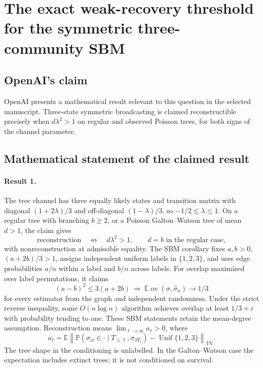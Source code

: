 \documentclass[11pt]{article}
\begin{document}
\section*{The exact weak-recovery threshold for the symmetric three-community SBM}

\subsection{OpenAI's claim}
OpenAI presents a mathematical result relevant to this question in the selected manuscript. Three-state symmetric broadcasting is claimed reconstructible precisely when $d\lambda^2>1$ on regular and observed Poisson trees, for both signs of the channel parameter.

\subsection{Mathematical statement of the claimed result}
\paragraph{Result 1.} The tree channel has three equally likely states and transition matrix with diagonal \((1+2\lambda)/3\) and off-diagonal \((1-\lambda)/3\), so \(-1/2\le\lambda\le1\). On a regular tree with branching \(b\ge2\), or a Poisson Galton--Watson tree of mean \(d>1\), the claim gives
\[
 \text{reconstruction}\quad\Longleftrightarrow\quad d\lambda^2>1,
 \qquad d=b\text{ in the regular case},
\]
with nonreconstruction at admissible equality. The SBM corollary fixes \(a,b>0\), \((a+2b)/3>1\), assigns independent uniform labels in \(\{1,2,3\}\), and uses edge probabilities \(a/n\) within a label and \(b/n\) across labels. For overlap maximized over label permutations, it claims
\[
 (a-b)^2\le3(a+2b)\ \Longrightarrow\
 \mathbb E\operatorname{ov}(\sigma,\widehat\sigma_n)\to1/3
\]
for every estimator from the graph and independent randomness. Under the strict reverse inequality, some \(O(n\log n)\) algorithm achieves overlap at least \(1/3+\varepsilon\) with probability tending to one. These SBM statements retain the mean-degree assumption. Reconstruction means $\lim_{\ell\to\infty}a_\ell>0$, where
\[
 a_\ell=\mathbb E\left\|\mathbb P(\sigma_{\varnothing}\in\cdot\mid T_{\le\ell},\sigma_{\partial T_\ell})-\operatorname{Unif}\{1,2,3\}\right\|_{\mathrm{TV}}.
\]
The tree shape in the conditioning is unlabelled. In the Galton--Watson case the expectation includes extinct trees; it is not conditioned on survival.
\end{document}
